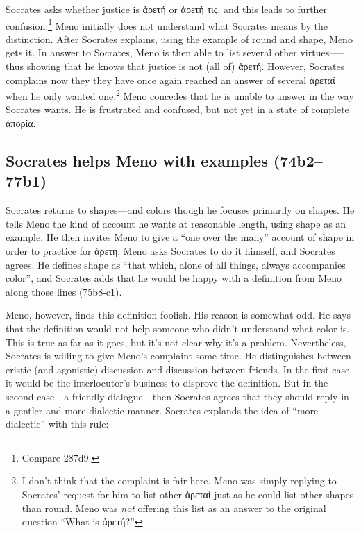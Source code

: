 \documentclass[11pt]{article}
\begin{document}
Socrates asks whether justice is {\g ἀρετή} or {\g ἀρετή τις}, and this leads to further confusion.\footnote{Compare  287d9.} Meno initially does not understand what Socrates means by the distinction. After Socrates explains, using the example of round and shape, Meno gets it. In answer to Socrates, Meno is then able to list several other virtues--—thus showing that he knows that justice is not (all of) {\g ἀρετή}. However, Socrates complains now they they have once again reached an answer of several {\g ἀρεταί} when he only wanted one.\footnote{I don't think that the complaint is fair here. Meno was simply replying to Socrates' request for him to list other {\g ἀρεταί} just as he could list other shapes than round. Meno was \emph{not} offering this list as an answer to the original question ``What is {\g ἀρετή}?''} Meno concedes that he is unable to answer in the way Socrates wants. He is frustrated and confused, but not yet in a state of complete {\g ἀπορία}.

\subsection{Socrates helps Meno with examples (74b2--77b1)}

Socrates returns to shapes---and colors though he focuses primarily on shapes. He tells Meno the kind of account he wants at reasonable length, using shape as an example. He then invites Meno to give a ``one over the many'' account of shape in order to practice for {\g ἀρετή}. Meno asks Socrates to do it himself, and Socrates agrees. He defines shape as ``that which, alone of all things, always accompanies color'', and Socrates adds that he would be happy with a definition from Meno along those lines (75b8-c1).

Meno, however, finds this definition foolish. His reason is somewhat odd. He says that the definition would not help someone who didn't understand what color is. This is true as far as it goes, but it's not clear why it's a problem. Nevertheless, Socrates is willing to give Meno's complaint some time. He distinguishes between eristic (and agonistic) discussion and discussion between friends. In the first case, it would be the interlocutor's business to disprove the definition. But in the second case---a friendly dialogue---then Socrates agrees that they should reply in a gentler and more dialectic manner. Socrates explands the idea of ``more dialectic'' with this rule:
\end{document}
